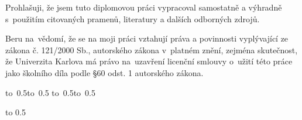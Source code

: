 \noindent
Prohlašuji, že jsem tuto diplomovou práci vypracoval samostatně a výhradně
s~použitím citovaných pramenů, literatury a dalších odborných zdrojů.

\medskip\noindent
Beru na~vědomí, že se na moji práci vztahují práva a povinnosti vyplývající
ze zákona č. 121/2000 Sb., autorského zákona v~platném znění, zejména skutečnost,
že Univerzita Karlova má právo na~uzavření licenční smlouvy o~užití této
práce jako školního díla podle §60 odst. 1 autorského zákona.

\vspace{10mm}

\hbox{\hbox to 0.5\hbox to 0.5\hsize{\dotfill\quad}}
\smallskip
\hbox{\hbox to 0.5\hsize{}\hbox to 0.5}

\vspace{20mm}
\newpage


\openright

\noindent

\newpage


\openright

\vbox to 0.5

\newpage



\openright

